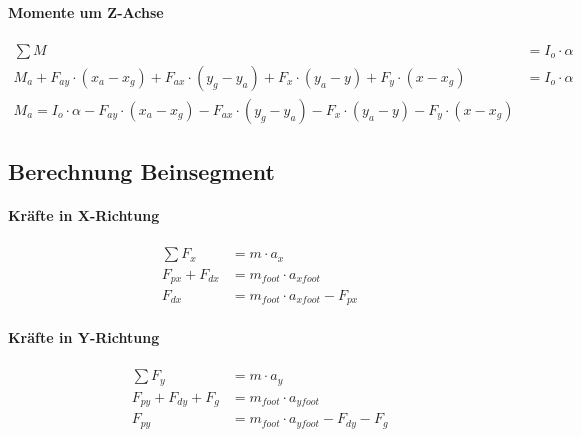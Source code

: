 \paragraph{Momente um Z-Achse}
\begin{equation*}
\begin{split}
\sum M &= I_o \cdot \alpha\\
M_a + F_{ay} \cdot (x_a - x_g) + F_{ax} \cdot (y_g-y_a) + F_x \cdot (y_a - y) + F_y \cdot (x -x_g) &= I_o \cdot \alpha\\
M_a = I_o \cdot \alpha - F_{ay} \cdot (x_a - x_g) - F_{ax} \cdot (y_g-y_a) - F_x \cdot (y_a - y) - F_y \cdot (x -x_g)
\end{split}
\end{equation*}

\subsection*{Berechnung Beinsegment}
\begin{minipage}{.5\linewidth}
	\paragraph{Kräfte in X-Richtung}
	\begin{equation*}
	\begin{split}
	\sum F_x &= m \cdot a_x\\
	F_{px} + F_{dx} &= m_{foot} \cdot a_{x foot}\\
	F_{dx}&= m_{foot} \cdot a_{x foot} - F_{px} 
	\end{split}
	\end{equation*}
	
	\paragraph{Kräfte in Y-Richtung}
	\begin{equation*}
	\begin{split}
	\sum F_y &= m \cdot a_y \\
	F_{py} + F_{dy} + F_g &= m_{foot} \cdot a_{y foot}\\
	F_{py} &= m_{foot} \cdot a_{y foot} -  F_{dy} - F_g
	\end{split}
	\end{equation*}
\end{minipage}%
